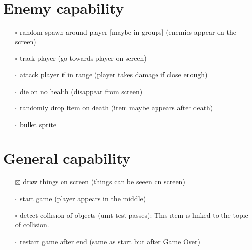 \documentclass[
]{article}
\providecommand{\tightlist}{%
  \setlength{\itemsep}{0pt}\setlength{\parskip}{0pt}}
\begin{document}
\section{Enemy capability}\label{enemy-capability}

\begin{itemize}
\tightlist
\item[$\square$]
  random spawn around player {[}maybe in groups{]} (enemies appear on
  the screen)
\item[$\square$]
  track player (go towards player on screen)
\item[$\square$]
  attack player if in range (player takes damage if close enough)
\item[$\square$]
  die on no health (disappear from screen)
\item[$\square$]
  randomly drop item on death (item maybe appears after death)
\item[$\square$]
    bullet sprite
\end{itemize}

\section{General capability}\label{general-capability}

\begin{itemize}
\tightlist
\item[$\boxtimes$]
  draw things on screen (things can be seeen on screen)
\item[$\square$]
  start game (player appears in the middle)
\item[$\square$]
  detect collision of objects (unit test passes): This item is linked to the topic of collision. 
\item[$\square$]
  restart game after end (same as start but after Game Over)
\end{itemize}
\end{document}
